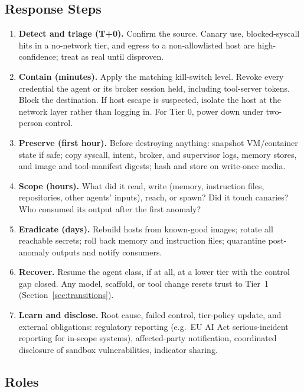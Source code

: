 \documentclass[11pt,letterpaper]{article}
\begin{document}
\subsection{Response Steps}

\begin{enumerate}
  \item \textbf{Detect and triage (T+0).} Confirm the source. Canary use, blocked-syscall hits in a no-network tier, and egress to a non-allowlisted host are high-confidence; treat as real until disproven.
  \item \textbf{Contain (minutes).} Apply the matching kill-switch level. Revoke every credential the agent or its broker session held, including tool-server tokens. Block the destination. If host escape is suspected, isolate the host at the network layer rather than logging in. For Tier 0, power down under two-person control.
  \item \textbf{Preserve (first hour).} Before destroying anything: snapshot VM/container state if safe; copy syscall, intent, broker, and supervisor logs, memory stores, and image and tool-manifest digests; hash and store on write-once media.
  \item \textbf{Scope (hours).} What did it read, write (memory, instruction files, repositories, other agents' inputs), reach, or spawn? Did it touch canaries? Who consumed its output after the first anomaly?
  \item \textbf{Eradicate (days).} Rebuild hosts from known-good images; rotate all reachable secrets; roll back memory and instruction files; quarantine post-anomaly outputs and notify consumers.
  \item \textbf{Recover.} Resume the agent class, if at all, at a lower tier with the control gap closed. Any model, scaffold, or tool change resets trust to Tier~1 (Section~\ref{sec:transitions}).
  \item \textbf{Learn and disclose.} Root cause, failed control, tier-policy update, and external obligations: regulatory reporting (e.g.\ EU AI Act serious-incident reporting for in-scope systems), affected-party notification, coordinated disclosure of sandbox vulnerabilities, indicator sharing.
\end{enumerate}

\subsection{Roles}
\end{document}
